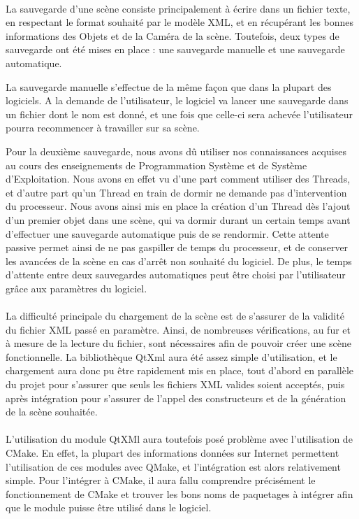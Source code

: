 \paragraph{}
La sauvegarde d'une scène consiste principalement à écrire dans un fichier texte, en respectant le format souhaité par le modèle XML, et en récupérant les bonnes informations des Objets et de la Caméra de la scène. Toutefois, deux types de sauvegarde ont été mises en place : une sauvegarde manuelle et une sauvegarde automatique.

La sauvegarde manuelle s'effectue de la même façon que dans la plupart des logiciels. A la demande de l'utilisateur, le logiciel va lancer une sauvegarde dans un fichier dont le nom est donné, et une fois que celle-ci sera achevée l'utilisateur pourra recommencer à travailler sur sa scène.

Pour la deuxième sauvegarde, nous avons dû utiliser nos connaissances acquises au cours des enseignements de Programmation Système et de Système d'Exploitation. Nous avons en effet vu d'une part comment utiliser des Threads, et d'autre part qu'un Thread en train de dormir ne demande pas d'intervention du processeur. Nous avons ainsi mis en place la création d'un Thread dès l'ajout d'un premier objet dans une scène, qui va dormir durant un certain temps avant d'effectuer une sauvegarde automatique puis de se rendormir. Cette attente passive permet ainsi de ne pas gaspiller de temps du processeur, et de conserver les avancées de la scène en cas d'arrêt non souhaité du logiciel. De plus, le temps d'attente entre deux sauvegardes automatiques peut être choisi par l'utilisateur grâce aux paramètres du logiciel.

\paragraph{}
La difficulté principale du chargement de la scène est de s'assurer de la validité du fichier XML passé en paramètre. Ainsi, de nombreuses vérifications, au fur et à mesure de la lecture du fichier, sont nécessaires afin de pouvoir créer une scène fonctionnelle. La bibliothèque QtXml aura été assez simple d'utilisation, et le chargement aura donc pu être rapidement mis en place, tout d'abord en parallèle du projet pour s'assurer que seuls les fichiers XML valides soient acceptés, puis après intégration pour s'assurer de l'appel des constructeurs et de la génération de la scène souhaitée.

\paragraph{}
L'utilisation du module QtXMl aura toutefois posé problème avec l'utilisation de CMake. En effet, la plupart des informations données sur Internet permettent l'utilisation de ces modules avec QMake, et l'intégration est alors relativement simple. Pour l'intégrer à CMake, il aura fallu comprendre précisément le fonctionnement de CMake et trouver les bons noms de paquetages à intégrer afin que le module puisse être utilisé dans le logiciel.

